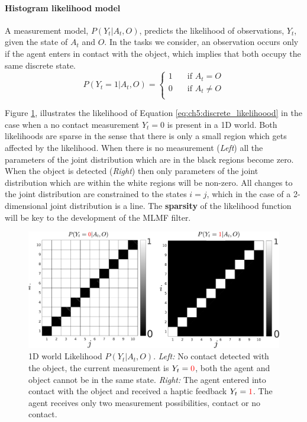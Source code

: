 \paragraph{Histogram likelihood model}

A measurement model, $P(Y_t|A_t,O)$, predicts the likelihood of observations, $Y_t$, given the state of $A_t$ and $O$. 
In the tasks we consider, an observation occurs only if the agent enters in contact with the object, which implies that both
occupy the same discrete state. 
\begin{equation} \label{eq:ch5:discrete_likelihoood}
P(Y_t=1|A_t,O) =
  \begin{cases}
    1       & \quad \text{if } A_t = O     \\
    0  	    & \quad \text{if } A_t \not= O \\
  \end{cases}
\end{equation}

Figure \ref{fig:histogram_likelihood}, illustrates the likelihood of Equation \ref{eq:ch5:discrete_likelihoood} 
in the case when a no contact measurement $Y_t=0$ is present in a 1D world. Both likelihoods are sparse in the sense that there is only a small 
region which gets affected by the likelihood. When there is no measurement (\textit{Left}) all the parameters of the 
joint distribution which are in the black regions become zero. When the object is detected (\textit{Right}) then 
only parameters of the joint distribution which are within the white regions will be non-zero. All changes
to the joint distribution are constrained to the states $i = j$, which in the case of a 2-dimensional joint 
distribution is a line. The \textbf{sparsity} of the likelihood function  will be key to the development of the MLMF filter.

\begin{figure}
 \centering
 \includegraphics[width=\textwidth]{./ch5-MLMF/Figures/explenation/hist_likelihood.pdf}
 \caption{1D world Likelihood $P(Y_t|A_t,O)$. \textit{Left:} No contact detected with the object, the current measurement 
 is $Y_t = \textcolor{red}0$, both the agent and object cannot be in the same state. \textit{Right:} The agent 
 entered into contact with the object and received a haptic feedback $Y_t = \textcolor{red}1$. The agent receives 
 only two measurement possibilities, contact or no contact.}
 \label{fig:histogram_likelihood}
\end{figure}

